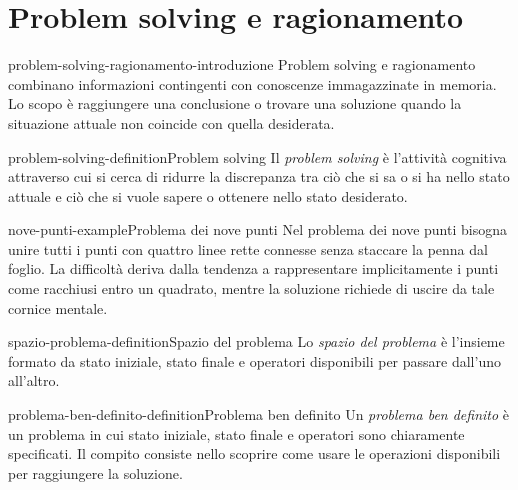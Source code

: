 \documentclass[preview]{standalone}
\begin{document}
\genpage

\section{Problem solving e ragionamento}

\begin{snippet}{problem-solving-ragionamento-introduzione}
    Problem solving e ragionamento combinano informazioni contingenti con
    conoscenze immagazzinate in memoria. Lo scopo è raggiungere una conclusione
    o trovare una soluzione quando la situazione attuale non coincide con quella
    desiderata.
\end{snippet}

\begin{snippetdefinition}{problem-solving-definition}{Problem solving}
    Il \emph{problem solving} è l'attività cognitiva attraverso cui si cerca di
    ridurre la discrepanza tra ciò che si sa o si ha nello stato attuale e ciò
    che si vuole sapere o ottenere nello stato desiderato.
\end{snippetdefinition}

\begin{snippetexample}{nove-punti-example}{Problema dei nove punti}
    Nel problema dei nove punti bisogna unire tutti i punti con quattro linee
    rette connesse senza staccare la penna dal foglio. La difficoltà deriva
    dalla tendenza a rappresentare implicitamente i punti come racchiusi entro
    un quadrato, mentre la soluzione richiede di uscire da tale cornice mentale.
\end{snippetexample}


\begin{snippetdefinition}{spazio-problema-definition}{Spazio del problema}
    Lo \emph{spazio del problema} è l'insieme formato da stato iniziale, stato
    finale e operatori disponibili per passare dall'uno all'altro.
\end{snippetdefinition}

\begin{snippetdefinition}{problema-ben-definito-definition}{Problema ben definito}
    Un \emph{problema ben definito} è un problema in cui stato iniziale, stato
    finale e operatori sono chiaramente specificati. Il compito consiste nello
    scoprire come usare le operazioni disponibili per raggiungere la soluzione.
\end{snippetdefinition}
\end{document}
